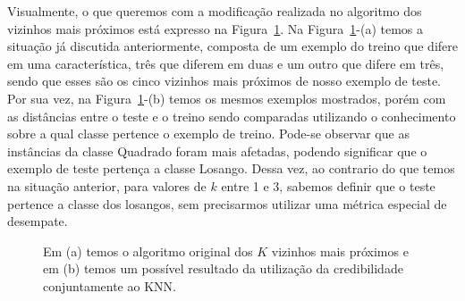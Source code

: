 Visualmente, o que queremos com a modificação realizada no algoritmo dos vizinhos mais próximos está expresso na Figura~\ref{fig::KNNantesedepois}. Na Figura~\ref{fig::KNNantesedepois}-(a) temos a situação já discutida anteriormente, composta de um exemplo do treino que difere em uma característica, três que diferem em duas e um outro que difere em três, sendo que esses são os cinco vizinhos mais próximos de nosso exemplo de teste. Por sua vez, na Figura~\ref{fig::KNNantesedepois}-(b) temos os mesmos exemplos mostrados, porém com as distâncias entre o teste e o treino sendo comparadas utilizando o conhecimento sobre a qual classe pertence o exemplo de treino. Pode-se observar que as instâncias da classe Quadrado foram mais afetadas, podendo significar que o exemplo de teste pertença a classe Losango. Dessa vez, ao contrario do que temos na situação anterior, para valores de $k$ entre 1 e 3, sabemos definir que o teste pertence a classe dos losangos, sem precisarmos utilizar uma métrica especial de desempate. 

\begin{figure}[ht]
\centering
{}
\caption{Em (a) temos o algoritmo original dos $K$ vizinhos mais próximos e em (b) temos um possível resultado da utilização da credibilidade conjuntamente ao \textsc{KNN}.  
\label{fig::KNNantesedepois}}
\end{figure}


